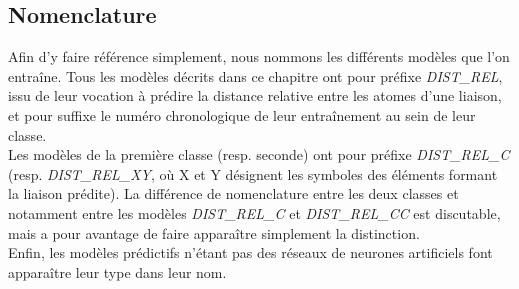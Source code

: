 \subsection{Nomenclature}
\par Afin d'y faire référence simplement, nous nommons les différents modèles que l'on entraîne. Tous les modèles décrits dans ce chapitre ont pour préfixe \emph{DIST\_REL}, issu de leur vocation à prédire la distance relative entre les atomes d'une liaison, et pour suffixe le numéro chronologique de leur entraînement au sein de leur classe.\\
Les modèles de la première classe (resp. seconde) ont pour préfixe \emph{DIST\_REL\_C} (resp. \emph{DIST\_REL\_XY}, où X et Y désignent les symboles des éléments formant la liaison prédite). La différence de nomenclature entre les deux classes et notamment entre les modèles \emph{DIST\_REL\_C} et \emph{DIST\_REL\_CC} est discutable, mais a pour avantage de faire apparaître simplement la distinction.\\
Enfin, les modèles prédictifs n'étant pas des réseaux de neurones artificiels font apparaître leur type dans leur nom.
